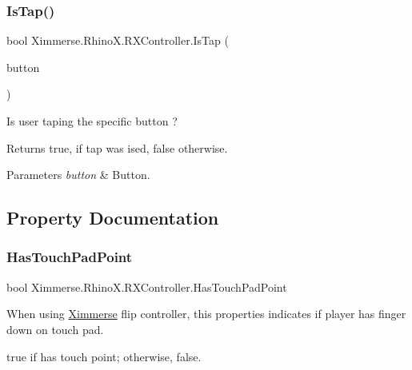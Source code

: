 \subsubsection{\texorpdfstring{Is\+Tap()}{IsTap()}}
{\footnotesize\ttfamily bool Ximmerse.\+Rhino\+X.\+R\+X\+Controller.\+Is\+Tap (\begin{DoxyParamCaption}\item[{\mbox{\hyperlink{namespace_ximmerse_1_1_rhino_x_a99f73f11bba9d4b424daba6c5a5abc0b}{Controller\+Button\+Code}}}]{button }\end{DoxyParamCaption})}



Is user taping the specific button ? 

\begin{DoxyReturn}{Returns}
{\ttfamily true}, if tap was ised, {\ttfamily false} otherwise.
\end{DoxyReturn}

\begin{DoxyParams}{Parameters}
{\em button} & Button.\\
\hline
\end{DoxyParams}


\subsection{Property Documentation}
\mbox{\label{class_ximmerse_1_1_rhino_x_1_1_r_x_controller_ac7f62ba234dae32195cd95530a8e2879}} 
\subsubsection{\texorpdfstring{Has\+Touch\+Pad\+Point}{HasTouchPadPoint}}
{\footnotesize\ttfamily bool Ximmerse.\+Rhino\+X.\+R\+X\+Controller.\+Has\+Touch\+Pad\+Point\hspace{0.3cm}{\ttfamily [get]}}



When using \mbox{\hyperlink{namespace_ximmerse}{Ximmerse}} flip controller, this properties indicates if player has finger down on touch pad. 

{\ttfamily true} if has touch point; otherwise, {\ttfamily false}.\mbox{\label{class_ximmerse_1_1_rhino_x_1_1_r_x_controller_a74749f7219b9eca23f4540de4c98fc48}} 
